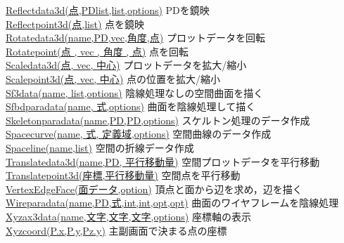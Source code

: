 \documentclass[papersize,a4paper,12pt,uplatex]{jsarticle}
\begin{document}
\begin{tabbing}
\hyperlink{reflectdata3d}{Reflectdata3d(点,PDlist,list,options)}  \>PDを鏡映\\
\hyperlink{reflectpoint3d}{Reflectpoint3d(点,list)}  \>点を鏡映\\
\hyperlink{rotatedata3d}{Rotatedata3d(name,PD,vec,角度,点)}  \>プロットデータを回転\\
\hyperlink{rotatepoint3d}{Rotatepoint(点 , vec , 角度 , 点)}  \>点を回転\\
\hyperlink{scaledata3d}{Scaledata3d(点, vec, 中心)}  \>プロットデータを拡大/縮小\\
\hyperlink{scalepoint3d}{Scalepoint3d(点, vec, 中心)}  \>点の位置を拡大/縮小\\
\hyperlink{sf3data}{Sf3data(name, list,options)}  \>陰線処理なしの空間曲面を描く\\
\hyperlink{sfbdparadata}{Sfbdparadata(name, 式,options)}  \>曲面を陰線処理して描く\\
\hyperlink{skeletonparadata}{Skeletonparadata(name,PD,PD,options)}  \>スケルトン処理のデータ作成\\
\hyperlink{spacecurve}{Spacecurve(name, 式, 定義域,options)}  \>空間曲線のデータ作成\\
\hyperlink{spaceline}{Spaceline(name,list)}  \>空間の折線データ作成\\
\hyperlink{translatedata3d}{Translatedata3d(name,PD, 平行移動量)}  \>空間プロットデータを平行移動\\
\hyperlink{translatepoint3d}{Translatepoint3d(座標,平行移動量)}  \>空間点を平行移動\\
\hyperlink{vertexedgeface}{VertexEdgeFace(面データ,option)}  \>頂点と面から辺を求め，辺を描く\\
\hyperlink{wireparadata}{Wireparadata(name,PD,式,int,int,opt,opt)}  \>曲面のワイヤフレームを陰線処理\\
\hyperlink{xyzax3data}{Xyzax3data(name,文字,文字,文字,options)}  \>座標軸の表示\\
\hyperlink{xyzcoord}{Xyzcoord(P.x,P.y,Pz.y)}  \>主副画面で決まる点の座標
\end{tabbing}
\end{document}
